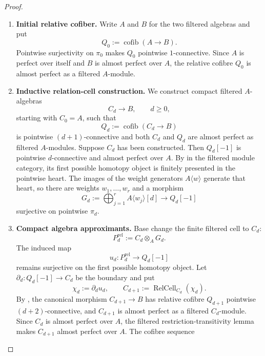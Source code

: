 \begin{proof}
\leavevmode
\begin{enumerate}[label=\textup{(\arabic*)}]
    \item \textbf{Initial relative cofiber.}
    Write \(A\) and \(B\) for the two filtered algebras and put
    \[
        Q_0:=\operatorname{cofib}(A\to B).
    \]
    Pointwise surjectivity on \(\pi_0\) makes \(Q_0\) pointwise
    \(1\)-connective. Since \(A\) is perfect over itself and \(B\) is almost
    perfect over \(A\), the relative cofibre \(Q_0\) is almost perfect as a
    filtered \(A\)-module.
    \item \textbf{Inductive relation-cell construction.}
    We construct compact filtered \(A\)-algebras
    \[
        C_d\longrightarrow B,
        \qquad d\geq0,
    \]
    starting with \(C_0=A\), such that
    \[
        Q_d:=\operatorname{cofib}(C_d\to B)
    \]
    is pointwise \((d+1)\)-connective and both \(C_d\) and \(Q_d\) are almost
    perfect as filtered \(A\)-modules. Suppose \(C_d\) has been constructed.
    Then \(Q_d[-1]\) is pointwise \(d\)-connective and almost perfect over
    \(A\). By  in the
    filtered module category, its first possible homotopy object is finitely
    presented in the pointwise heart. The images of the weight generators
    \(A\langle w\rangle\) generate that heart, so there are weights
    \(w_1,\ldots,w_r\) and a morphism
    \[
        G_d:=\bigoplus_{j=1}^rA\langle w_j\rangle[d]
        \longrightarrow
        Q_d[-1]
    \]
    surjective on pointwise \(\pi_d\).
    \item \textbf{Compact algebra approximants.}
    Base change the finite filtered cell to \(C_d\):
    \[
        P_d^{\mathrm{rel}}
        :=
        C_d\otimes_AG_d.
    \]
    The induced map
    \[
        u_d:P_d^{\mathrm{rel}}\longrightarrow Q_d[-1]
    \]
    remains surjective on the first possible homotopy object. Let
    \(\partial_d:Q_d[-1]\to C_d\) be the boundary and put
    \[
        \chi_d:=\partial_du_d,
        \qquad
        C_{d+1}:=\operatorname{RelCell}_{C_d}(\chi_d).
    \]
    By , the canonical morphism
    \(C_{d+1}\to B\) has relative cofibre \(Q_{d+1}\) pointwise
    \((d+2)\)-connective, and \(C_{d+1}\) is almost perfect as a filtered
    \(C_d\)-module. Since \(C_d\) is almost perfect over \(A\), the filtered
    restriction-transitivity lemma
     makes
    \(C_{d+1}\) almost perfect over \(A\). The cofibre sequence

\end{enumerate}
\end{proof}
